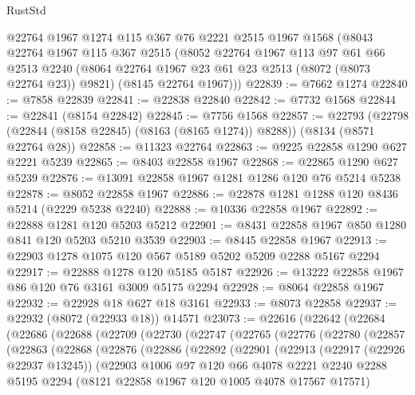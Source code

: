 \begin{lexlean}{RustStd}
\begin{coremodule}
{\begin{coremodule}
{{{{{{{{{{{{{{{{{{{{{{{{{{{{{{{{{{{{{{{{{{{{{{{{{{{{{    @22764
    @1967
    @1274
    @115
    @367
    @76
    @2221
    @2515
    @1967
    @1568
    (@8043
      @22764
      @1967
      @115
      @367
      @2515
      (@8052
        @22764
        @1967
        @113
        @97
        @61
        @66
        @2513
        @2240
        (@8064 @22764 @1967 @23 @61 @23 @2513 (@8072 (@8073 @22764 @23)) @9821)
        (@8145 @22764 @1967)))
@22839 := @7662 @1274
@22840 := @7858 @22839
@22841 := @22838 @22840
@22842 := @7732 @1568
@22844 := @22841 (@8154 @22842)
@22845 := @7756 @1568
@22857 := @22793
    (@22798 (@22844 (@8158 @22845) (@8163 (@8165 @1274)) @8288))
    (@8134 (@8571 @22764 @28))
@22858 := @11323 @22764
@22863 := @9225 @22858 @1290 @627 @2221 @5239
@22865 := @8403 @22858 @1967
@22868 := @22865 @1290 @627 @5239
@22876 := @13091 @22858 @1967 @1281 @1286 @120 @76 @5214 @5238
@22878 := @8052 @22858 @1967
@22886 := @22878 @1281 @1288 @120 @8436 @5214 (@2229 @5238 @2240)
@22888 := @10336 @22858 @1967
@22892 := @22888 @1281 @120 @5203 @5212
@22901 := @8431 @22858 @1967 @850 @1280 @841 @120 @5203 @5210 @3539
@22903 := @8445 @22858 @1967
@22913 := @22903 @1278 @1075 @120 @567 @5189 @5202 @5209 @2288 @5167 @2294
@22917 := @22888 @1278 @120 @5185 @5187
@22926 := @13222 @22858 @1967 @86 @120 @76 @3161 @3009 @5175 @2294
@22928 := @8064 @22858 @1967
@22932 := @22928 @18 @627 @18 @3161
@22933 := @8073 @22858
@22937 := @22932 (@8072 (@22933 @18)) @14571
@23073 := @22616
    (@22642
      (@22684
        (@22686
          (@22688
            (@22709
              (@22730
                (@22747
                  (@22765
                    (@22776
                      (@22780
                        (@22857
                          (@22863
                            (@22868
                              (@22876
                                (@22886
                                  (@22892
                                    (@22901
                                      (@22913
                                        (@22917 (@22926 @22937 @13245))
                                        (@22903
                                          @1006
                                          @97
                                          @120
                                          @66
                                          @4078
                                          @2221
                                          @2240
                                          @2288
                                          @5195
                                          @2294
                                          (@8121 @22858 @1967 @120 @1005 @4078 @17567 @17571)
}}}}}}}}}}}}}}}}}}}}}}}}}}}}}}}}}}}}}}}}}}}}}}}}}}}}}
\end{coremodule}}
\end{coremodule}
\end{lexlean}
